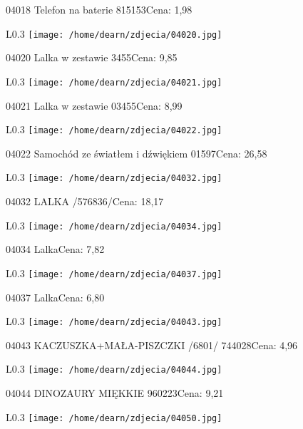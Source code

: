 04018 Telefon na baterie 815153Cena: 1,98\newline
\begin{wrapfigure}{L}{0.3\textwidth}
\texttt{[image: /home/dearn/zdjecia/04020.jpg]}
\end{wrapfigure}
04020 Lalka w zestawie 3455Cena: 9,85\newline
\begin{wrapfigure}{L}{0.3\textwidth}
\texttt{[image: /home/dearn/zdjecia/04021.jpg]}
\end{wrapfigure}
04021 Lalka w zestawie 03455Cena: 8,99\newline
\begin{wrapfigure}{L}{0.3\textwidth}
\texttt{[image: /home/dearn/zdjecia/04022.jpg]}
\end{wrapfigure}
04022 Samochód ze światłem i dźwiękiem 01597Cena: 26,58\newline
\begin{wrapfigure}{L}{0.3\textwidth}
\texttt{[image: /home/dearn/zdjecia/04032.jpg]}
\end{wrapfigure}
04032 LALKA /576836/Cena: 18,17\newline
\begin{wrapfigure}{L}{0.3\textwidth}
\texttt{[image: /home/dearn/zdjecia/04034.jpg]}
\end{wrapfigure}
04034 LalkaCena: 7,82\newline
\begin{wrapfigure}{L}{0.3\textwidth}
\texttt{[image: /home/dearn/zdjecia/04037.jpg]}
\end{wrapfigure}
04037 LalkaCena: 6,80\newline
\begin{wrapfigure}{L}{0.3\textwidth}
\texttt{[image: /home/dearn/zdjecia/04043.jpg]}
\end{wrapfigure}
04043 KACZUSZKA+MAŁA-PISZCZKI /6801/                  744028Cena: 4,96\newline
\begin{wrapfigure}{L}{0.3\textwidth}
\texttt{[image: /home/dearn/zdjecia/04044.jpg]}
\end{wrapfigure}
04044 DINOZAURY MIĘKKIE 960223Cena: 9,21\newline
\begin{wrapfigure}{L}{0.3\textwidth}
\texttt{[image: /home/dearn/zdjecia/04050.jpg]}
\end{wrapfigure}
